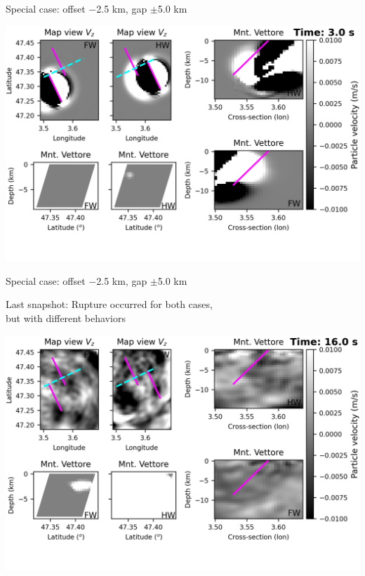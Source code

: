 \documentclass{beamer}
\begin{document}
\begin{frame}
 {Special case: offset $-$2.5 km, gap $\pm$5.0 km}

\begin{center}
    \includegraphics[width=1\linewidth]{images/video_waves/horizontal_delta_00015}
\end{center}
\addtocounter{framenumber}{-1}

\end{frame}


\begin{frame}
 {Special case: offset $-$2.5 km, gap $\pm$5.0 km}

\begin{center}

Last snapshot: Rupture occurred for both cases, \\ but with different behaviors

    \includegraphics[width=1\linewidth]{images/video_waves/horizontal_delta_00080}
\end{center}
\addtocounter{framenumber}{-1}

\end{frame}
\end{document}
